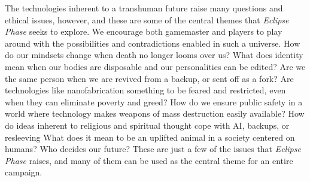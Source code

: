 The technologies inherent to a transhuman future 
raise many questions and ethical issues, however, and 
these are some of the central themes that \textit{Eclipse }
\textit{Phase} seeks to explore. We encourage both gamemaster
and players to play around with the possibilities
and contradictions enabled in such a universe. How 
do our mindsets change when death no longer looms 
over us? What does identity mean when our bodies 
are disposable and our personalities can be edited? 
Are we the same person when we are revived from 
a backup, or sent off as a fork? Are technologies like 
nanofabrication something to be feared and restricted, 
even when they can eliminate poverty and greed? 
How do we ensure public safety in a world where 
technology makes weapons of mass destruction easily 
available? How do ideas inherent to religious and 
spiritual thought cope with AI, backups, or resleeving
What does it mean to be an uplifted animal in a
society centered on humans? Who decides our future? 
These are just a few of the issues that \textit{Eclipse Phase}
raises, and many of them can be used as the central 
theme for an entire campaign.